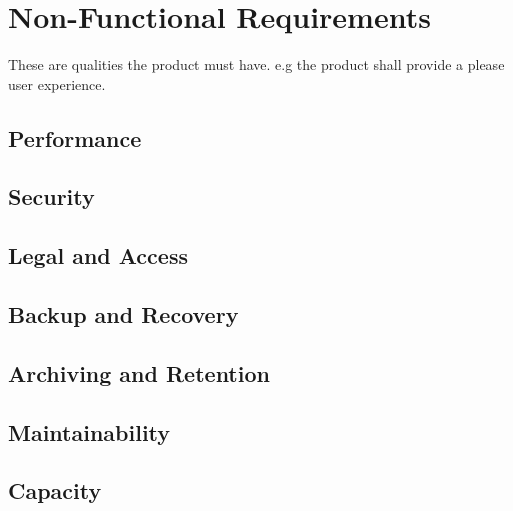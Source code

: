 \section{Non-Functional Requirements}

These are qualities the product must have.
e.g the product shall provide a please user experience.


\subsection{Performance}

\subsection{Security}

\subsection{Legal and Access}

\subsection{Backup and Recovery}

\subsection{Archiving and Retention}

\subsection{Maintainability}

\subsection{Capacity}

